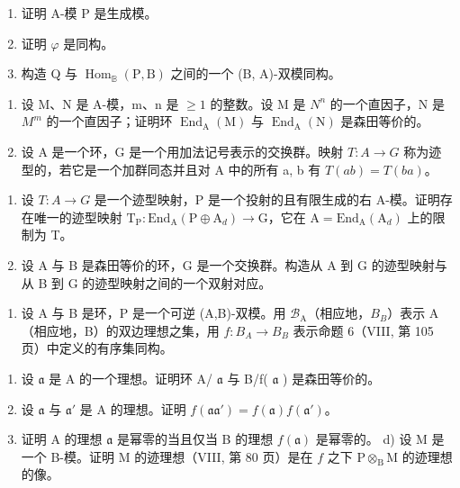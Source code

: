 \begin{enumerate}
\def\labelenumi{\alph{enumi})}
\item
  证明 A-模 P 是生成模。
\item
  证明 \(\varphi\) 是同构。
\item
  构造 Q 与 \(\operatorname{Hom}_{\mathbb{B}}(\mathrm{P}, \mathrm{B})\) 之间的一个 (B, A)-双模同构。
\end{enumerate}

\begin{enumerate}
\def\labelenumi{\arabic{enumi})}
\setcounter{enumi}{1}
\item
  设 M、N 是 A-模，m、n 是 \(\geqslant 1\) 的整数。设 M 是 \(N^{n}\) 的一个直因子，N 是 \(M^{m}\) 的一个直因子；证明环 \(\operatorname{End}_{\mathrm{A}}(\mathrm{M})\) 与 \(\operatorname{End}_{\mathrm{A}}(\mathrm{N})\) 是森田等价的。
\item
  设 A 是一个环，G 是一个用加法记号表示的交换群。映射 \(T: A \to G\) 称为迹型的，若它是一个加群同态并且对 A 中的所有 a, b 有 \(T(ab) = T(ba)\)。
\end{enumerate}

\begin{enumerate}
\def\labelenumi{\alph{enumi})}
\item
  设 \(T : A \to G\) 是一个迹型映射，P 是一个投射的且有限生成的右 A-模。证明存在唯一的迹型映射 \(\mathrm{T}_{\mathrm{P}} : \mathrm{End}_{\mathrm{A}}(\mathrm{P} \oplus \mathrm{A}_{d}) \to \mathrm{G}\)，它在 \(\mathrm{A} = \mathrm{End}_{\mathrm{A}}(\mathrm{A}_{d})\) 上的限制为 T。
\item
  设 A 与 B 是森田等价的环，G 是一个交换群。构造从 A 到 G 的迹型映射与从 B 到 G 的迹型映射之间的一个双射对应。
\end{enumerate}

\begin{enumerate}
\def\labelenumi{\arabic{enumi})}
\setcounter{enumi}{3}
\tightlist
\item
  设 A 与 B 是环，P 是一个可逆 (A,B)-双模。用 \(\mathcal{B}_{\mathrm{A}}\)（相应地，\(B_{B}\)）表示 A（相应地，B）的双边理想之集，用 \(f: B_{A} \to B_{B}\) 表示命题 6（VIII, 第 105 页）中定义的有序集同构。
\end{enumerate}

\begin{enumerate}
\def\labelenumi{\alph{enumi})}
\item
  设 \(\mathfrak{a}\) 是 A 的一个理想。证明环 A/ \(\mathfrak{a}\) 与 B/f( \(\mathfrak{a}\) ) 是森田等价的。
\item
  设 \(\mathfrak{a}\) 与 \(\mathfrak{a}'\) 是 A 的理想。证明 \(f(\mathfrak{aa}') = f(\mathfrak{a})f(\mathfrak{a}')\)。
\item
  证明 A 的理想 \(\mathfrak{a}\) 是幂零的当且仅当 B 的理想 \(f(\mathfrak{a})\) 是幂零的。 d) 设 M 是一个 B-模。证明 M 的迹理想（VIII, 第 80 页）是在 \(f\) 之下 \(\mathrm{P} \otimes_{\mathrm{B}} \mathrm{M}\) 的迹理想的像。
\end{enumerate}

